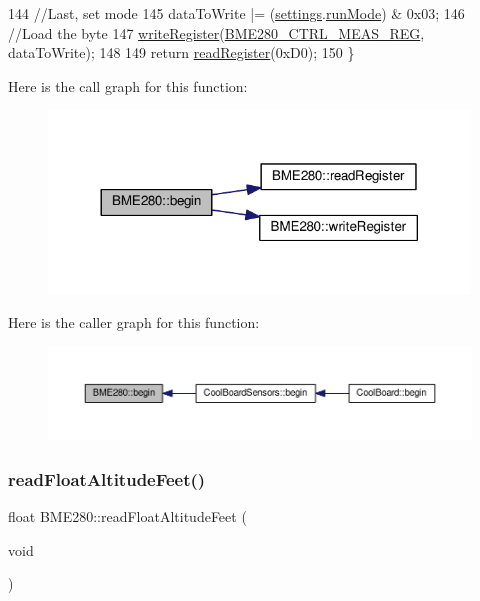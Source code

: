 \begin{DoxyCode}
144     \textcolor{comment}{//Last, set mode}
145     dataToWrite |= (\hyperlink{class_b_m_e280_af06253eb2f8ad4b5fabb858bc4a973bf}{settings}.\hyperlink{struct_sensor_settings_a0ffbdf34f4c23a2a167f00e4cb971dec}{runMode}) & 0x03;
146     \textcolor{comment}{//Load the byte}
147     \hyperlink{class_b_m_e280_afcff21c342725246bf415d7f0e4d04f0}{writeRegister}(\hyperlink{_cool_spark_fun_b_m_e280_8h_a34483b4a562393f91fe3f01d676abb88}{BME280\_CTRL\_MEAS\_REG}, dataToWrite);
148     
149     \textcolor{keywordflow}{return} \hyperlink{class_b_m_e280_a1bbd14c8591966df531e40085342ff71}{readRegister}(0xD0);
150 \}
\end{DoxyCode}
Here is the call graph for this function\+:\nopagebreak
\begin{figure}[H]
\begin{center}
\leavevmode
\includegraphics[width=317pt]{df/dcf/class_b_m_e280_a994c102f010547f9c740a338ef9905c7_cgraph}
\end{center}
\end{figure}
Here is the caller graph for this function\+:\nopagebreak
\begin{figure}[H]
\begin{center}
\leavevmode
\includegraphics[width=350pt]{df/dcf/class_b_m_e280_a994c102f010547f9c740a338ef9905c7_icgraph}
\end{center}
\end{figure}
\mbox{\label{class_b_m_e280_a6525c8a26f887b52596c86bed99343cb}} 
\subsubsection{\texorpdfstring{read\+Float\+Altitude\+Feet()}{readFloatAltitudeFeet()}}
{\footnotesize\ttfamily float B\+M\+E280\+::read\+Float\+Altitude\+Feet (\begin{DoxyParamCaption}\item[{void}]{ }\end{DoxyParamCaption})}



